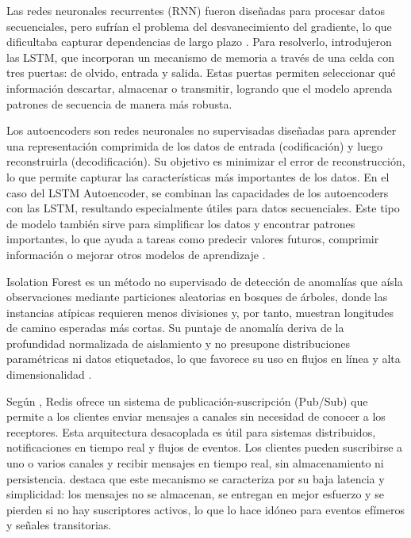 
Las redes neuronales recurrentes (RNN) fueron diseñadas para procesar datos secuenciales, pero sufrían el problema del desvanecimiento del gradiente, lo que dificultaba capturar dependencias de largo plazo \cite{heaton2018ian}. Para resolverlo, \citeauthor{hochreiter1997long} introdujeron las LSTM, que incorporan un mecanismo de memoria a través de una celda con tres puertas: de olvido, entrada y salida. Estas puertas permiten seleccionar qué información descartar, almacenar o transmitir, logrando que el modelo aprenda patrones de secuencia de manera más robusta.

Los autoencoders son redes neuronales no supervisadas diseñadas para aprender una representación comprimida de los datos de entrada (codificación) y luego reconstruirla (decodificación). Su objetivo es minimizar el error de reconstrucción, lo que permite capturar las características más importantes de los datos. En el caso del LSTM Autoencoder, se combinan las capacidades de los autoencoders con las LSTM, resultando especialmente útiles para datos secuenciales. Este tipo de modelo también sirve para simplificar los datos y encontrar patrones importantes, lo que ayuda a tareas como predecir valores futuros, comprimir información o mejorar otros modelos de aprendizaje \cite{malhotra2015long}.

Isolation Forest es un método no supervisado de detección de anomalías que aísla observaciones mediante particiones aleatorias en bosques de árboles, donde las instancias atípicas requieren menos divisiones y, por tanto, muestran longitudes de camino esperadas más cortas. Su puntaje de anomalía deriva de la profundidad normalizada de aislamiento y no presupone distribuciones paramétricas ni datos etiquetados, lo que favorece su uso en flujos en línea y alta dimensionalidad \cite{aggarwal2016introduction}.

Según \citeauthor{carlson2013action} \citeyear{carlson2013action}, Redis ofrece un sistema de publicación-suscripción (Pub/Sub) que permite a los clientes enviar mensajes a canales sin necesidad de conocer a los receptores. Esta arquitectura desacoplada es útil para sistemas distribuidos, notificaciones en tiempo real y flujos de eventos. Los clientes pueden suscribirse a uno o varios canales y recibir mensajes en tiempo real, sin almacenamiento ni persistencia. \citeauthor{carlson2013action} \citeyear{carlson2013action} destaca que este mecanismo se caracteriza por su baja latencia y simplicidad: los mensajes no se almacenan, se entregan en mejor esfuerzo y se pierden si no hay suscriptores activos, lo que lo hace idóneo para eventos efímeros y señales transitorias.
